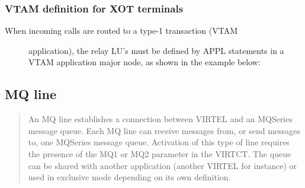 \documentclass[letterpaper,10pt,english]{sphinxmanual}
\begin{document}
\subsubsection{VTAM definition for XOT terminals}
\label{\detokenize{connectivity_guide:vtam-definition-for-xot-terminals}}\begin{description}
\item[{When incoming calls are routed to a type-1 transaction (VTAM}] \leavevmode
application), the relay LU’s must be defined by APPL statements in a
VTAM application major node, as shown in the example below:

\end{description}

\begin{sphinxVerbatim}[commandchars=\\\{\}]
  
  
  
  
\end{sphinxVerbatim}


\subsection{MQ line}
\label{\detokenize{connectivity_guide:mq-line}}\begin{quote}

An MQ line establishes a connection between VIRTEL and an MQSeries
message queue. Each MQ line can receive messages from, or send
messages to, one MQSeries message queue. Activation of this type of
line requires the presence of the MQ1 or MQ2 parameter in the
VIRTCT. The queue can be shared with another application (another
VIRTEL for instance) or used in exclusive mode depending on its own
definition.
\end{quote}
\end{document}

